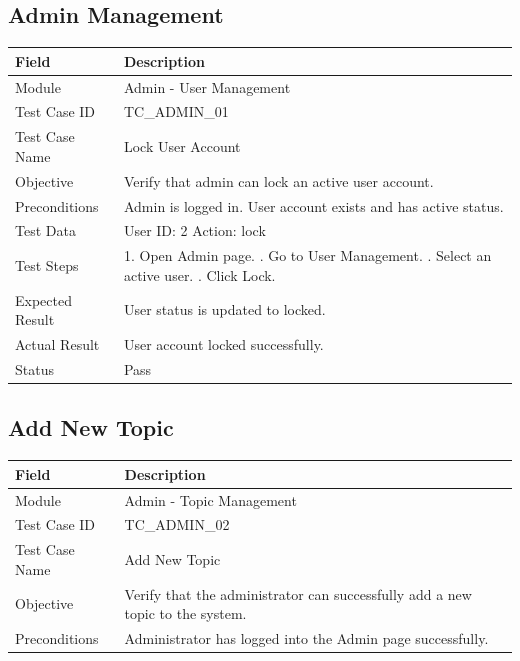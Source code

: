 \documentclass[12pt,a4paper]{article}
\begin{document}
{{\subsection{Admin Management}
\begin{longtable}{|p{4cm}|p{10cm}|}
	\hline
	\textbf{Field} & \textbf{Description} \\ \hline
	Module & Admin - User Management \\ \hline
	Test Case ID & TC\_ADMIN\_01 \\ \hline
	Test Case Name & Lock User Account \\ \hline
	Objective & Verify that admin can lock an active user account. \\ \hline
	Preconditions & Admin is logged in. User account exists and has active status. \\ \hline
	Test Data & User ID: 2 \newline Action: lock \\ \hline
	Test Steps &
	1. Open Admin page. \newline
	2. Go to User Management. \newline
	3. Select an active user. \newline
	4. Click Lock. \\ \hline
	Expected Result & User status is updated to locked. \\ \hline
	Actual Result & User account locked successfully. \\ \hline
	Status & Pass \\ \hline
\end{longtable}
\subsection{Add New Topic}
\begin{longtable}{|p{4cm}|p{10cm}|}
	\hline
	\textbf{Field} & \textbf{Description} \\ \hline
	
	Module & Admin - Topic Management \\ \hline
	
	Test Case ID & TC\_ADMIN\_02 \\ \hline
	
	Test Case Name & Add New Topic \\ \hline
	
	Objective &
	Verify that the administrator can successfully add a new topic to the system. \\ \hline
	
	Preconditions &
	Administrator has logged into the Admin page successfully. \\ \hline
	

\end{longtable}}}
\end{document}
